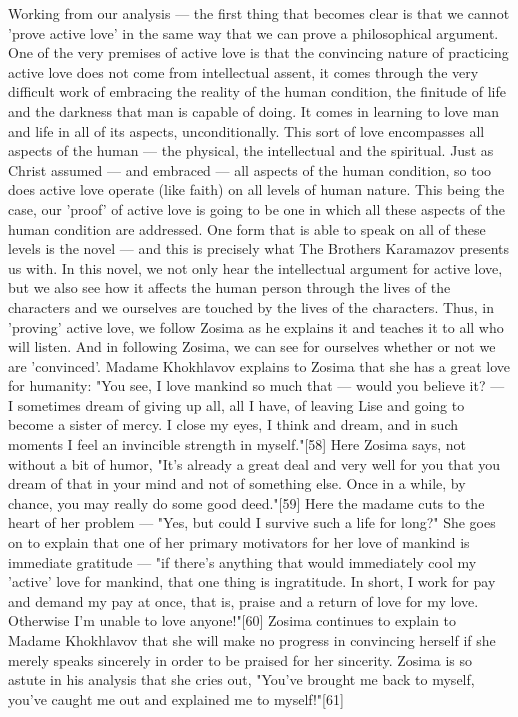 Working from our analysis — the first thing that becomes clear is that we cannot 'prove active love' in the same way that we can prove a philosophical argument. One of the very premises of active love is that the convincing nature of practicing active love does not come from intellectual assent, it comes through the very difficult work of embracing the reality of the human condition, the finitude of life and the darkness that man is capable of doing. It comes in learning to love man and life in all of its aspects, unconditionally. This sort of love encompasses all aspects of the human — the physical, the intellectual and the spiritual. Just as Christ assumed — and embraced — all aspects of the human condition, so too does active love operate (like faith) on all levels of human nature. This being the case, our 'proof' of active love is going to be one in which all these aspects of the human condition are addressed. 
One form that is able to speak on all of these levels is the novel — and this is precisely what The Brothers Karamazov presents us with. In this novel, we not only hear the intellectual argument for active love, but we also see how it affects the human person through the lives of the characters and we ourselves are touched by the lives of the characters. Thus, in 'proving' active love, we follow Zosima as he explains it and teaches it to all who will listen. And in following Zosima, we can see for ourselves whether or not we are 'convinced'.
Madame Khokhlavov explains to Zosima that she has a great love for humanity: "You see, I love mankind so much that — would you believe it? — I sometimes dream of giving up all, all I have, of leaving Lise and going to become a sister of mercy. I close my eyes, I think and dream, and in such moments I feel an invincible strength in myself."[58] Here Zosima says, not without a bit of humor, "It's already a great deal and very well for you that you dream of that in your mind and not of something else. Once in a while, by chance, you may really do some good deed."[59]
Here the madame cuts to the heart of her problem — "Yes, but could I survive such a life for long?" She goes on to explain that one of her primary motivators for her love of mankind is immediate gratitude — "if there's anything that would immediately cool my 'active' love for mankind, that one thing is ingratitude. In short, I work for pay and demand my pay at once, that is, praise and a return of love for my love. Otherwise I'm unable to love anyone!"[60] Zosima continues to explain to Madame Khokhlavov that she will make no progress in convincing herself if she merely speaks sincerely in order to be praised for her sincerity. Zosima is so astute in his analysis that she cries out, "You've brought me back to myself, you've caught me out and explained me to myself!"[61]
